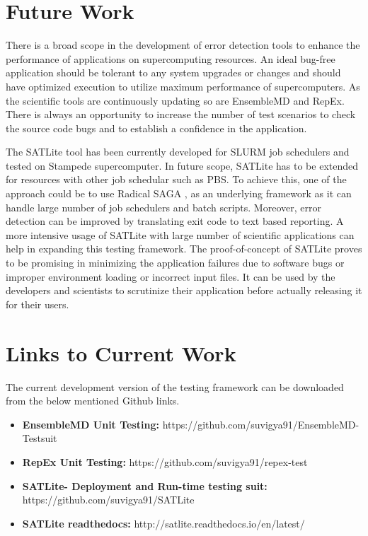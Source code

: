 \documentclass[10pt]{ruthesis}
\begin{document}
\section{Future Work}
There is a broad scope in the development of error detection tools to enhance the performance of applications on supercomputing resources. An ideal bug-free application should be tolerant to any system upgrades or changes and should have optimized execution to utilize maximum performance of supercomputers. As the scientific tools are continuously updating so are EnsembleMD and RepEx. There is always an opportunity to increase the number of test scenarios to check the source code bugs and to establish a confidence in the application. 

The SATLite tool has been currently developed for SLURM job schedulers and tested on Stampede supercomputer. In future scope, SATLite has to be extended for resources with other job schedular such as PBS. To achieve this, one of the approach could be to use Radical SAGA \cite{ref23},\cite{site9} as an underlying framework as it can handle large number of job schedulers and batch scripts. Moreover, error detection can be improved by translating exit code to text based reporting. A more intensive usage of SATLite with large number of scientific applications can help in expanding this testing framework. The proof-of-concept of SATLite proves to be promising in minimizing the application failures due to software bugs or improper environment loading or incorrect input files. It can be used by the developers and scientists to scrutinize their application before actually releasing it for their users.

\section{Links to Current Work}
The current development version of the testing framework can be downloaded from the below mentioned Github links.

\begin{itemize}
\item \textbf{EnsembleMD Unit Testing:} https://github.com/suvigya91/EnsembleMD-Testsuit

\item \textbf{RepEx Unit Testing:} https://github.com/suvigya91/repex-test

\item \textbf{SATLite- Deployment and Run-time testing suit:} https://github.com/suvigya91/SATLite

\item \textbf{SATLite readthedocs:} http://satlite.readthedocs.io/en/latest/
\end{itemize}
%
\end{document}
